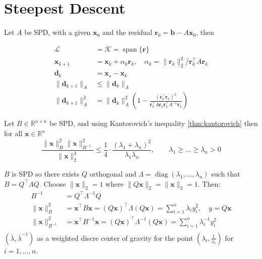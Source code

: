 \documentclass[../../main.tex]{subfiles}
\begin{document}
\chapter{Steepest Descent}\label{ch:SD}

Let $A$ be SPD, with a given $\mathbf{x}_0$ and the residual $\mathbf{r}_0 = \mathbf{b} - A\mathbf{x}_0$, then

\begin{align*}
    \mathcal{L}              & = \mathcal{K} = \operatorname{span}\{\mathbf{r}\}                                                                                                              \\
    \mathbf{x}_{k+1}         & = \mathbf{x}_k + \alpha_k \mathbf{r}_k, \quad \alpha_k = \|\mathbf{r}_k\|_2^2 / \mathbf{r}_k^{\top} A \mathbf{r}_k                                             \\
    \mathbf{d}_k             & = \mathbf{x}_{\star} - \mathbf{x}_k                                                                                                                            \\
    \|\mathbf{d}_{k+1}\|_A   & \leq \|\mathbf{d}_k\|_A                                                                                                                                        \\
    \|\mathbf{d}_{k+1}\|_A^2 & = \|\mathbf{d}_k\|_A^2\left(1 - \frac{(\mathbf{r}_k^{\top} \mathbf{r}_k)^2}{\mathbf{r}_k^{\top} A \mathbf{r}_k \mathbf{r}_k^{\top} A^{-1} \mathbf{r}_k}\right)
\end{align*}

Let $B \in \mathbb{R}^{n \times n}$ be SPD, and using Kantorovich's inequality \ref{thm:kantorovich} then for all $\mathbf{x} \in \mathbb{R}^n$
\[
    \frac{\|\mathbf{x}\|_B^2 \|\mathbf{x}\|_{B^{-1}}^2}{\|\mathbf{x}\|_2^4} \leq \frac{1}{4}\cdot\frac{(\lambda_1 + \lambda_n)^2}{\lambda_1 \lambda_n}, \qquad \lambda_1 \geq \ldots \geq \lambda_n > 0
\]

$B$ is SPD so there exists $Q$ orthogonal and $\Lambda = \operatorname{diag}(\lambda_1, \ldots, \lambda_n)$ such that $B = Q^{\top}\Lambda Q$. Choose $\|\mathbf{x}\|_2 = 1$ where $\|Q \mathbf{x}\|_2 = \|\mathbf{x}\|_2 = 1$. Then:
\begin{align*}
    B^{-1}                    & = Q^{\top} \Lambda^{-1} Q                                                                                                           \\
    \|\mathbf{x}\|_B^2        & = \mathbf{x}^{\top} B \mathbf{x} = (Q\mathbf{x})^{\top} \Lambda (Q\mathbf{x}) = \sum_{i=1}^n \lambda_i y_i^2, \quad y = Q\mathbf{x} \\
    \|\mathbf{x}\|_{B^{-1}}^2 & = \mathbf{x}^{\top} B^{-1} \mathbf{x} = (Q\mathbf{x})^{\top} \Lambda^{-1} (Q\mathbf{x}) = \sum_{i=1}^n \lambda_i^{-1} y_i^2         \\
\end{align*}
$(\overline{\lambda}, \overline{\lambda}^{-1})$ as a weighted discre center of gravity for the point $(\lambda_i, \frac{1}{\lambda_i})$ for $i = 1, \ldots, n$.
\end{document}
